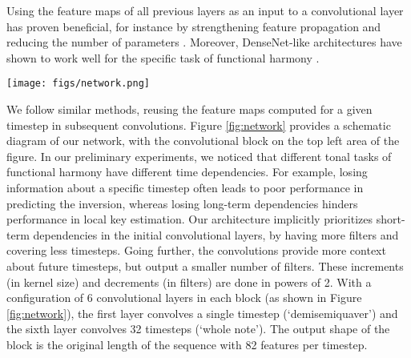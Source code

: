 

Using the feature maps of all previous layers as an input to
a convolutional layer has proven beneficial, for instance by
strengthening feature propagation and reducing the number of
parameters \cite{huang2017densely}. Moreover, DenseNet-like
architectures have shown to work well for the specific task
of functional harmony \cite{micchi2020not}.

\begin{figure*}
 \centerline{\texttt{[image: figs/network.png]}}
 \caption{\emph{AugmentedNet}. The bass and chroma inputs
 are processed through independent convolutional blocks and
 then concatenated. Both convolutional blocks are identical
 and expanded on the top of the figure. A convolutional
 block has six 1D convolutional layers. Each layer doubles
 the kernel size (number of timesteps covered) and halves
 the number of output filters, prioritizing short-term
 dependencies but providing long-term context that benefits
 the subsequent GRU layers.}
 \label{fig:network}
\end{figure*}

We follow similar methods, reusing the feature maps computed
for a given timestep in subsequent convolutions. Figure
\ref{fig:network} provides a schematic diagram of our
network, with the convolutional block on the top left area
of the figure. In our preliminary experiments, we noticed
that different tonal tasks of functional harmony have
different time dependencies. For example, losing information
about a specific timestep often leads to poor performance in
predicting the inversion, whereas losing long-term
dependencies hinders performance in local key estimation.
Our architecture implicitly prioritizes short-term
dependencies in the initial convolutional layers, by having
more filters and covering less timesteps. Going further, the
convolutions provide more context about future timesteps,
but output a smaller number of filters. These increments (in
kernel size) and decrements (in filters) are done in powers
of 2. With a configuration of 6 convolutional layers in each
block (as shown in Figure \ref{fig:network}), the first
layer convolves a single timestep (`demisemiquaver') and the
sixth layer convolves 32 timesteps (`whole note'). The
output shape of the block is the original length of the
sequence with 82 features per timestep.
